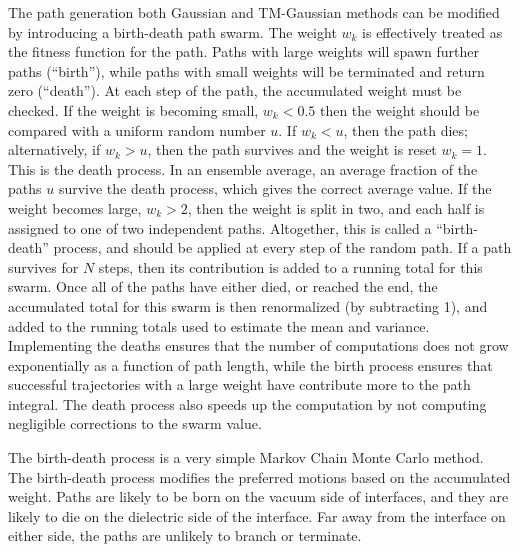 
The path generation both Gaussian and TM-Gaussian methods can be modified by introducing a birth-death path swarm.  
The weight $w_k$ is effectively treated as 
the fitness function for the path.  Paths with large weights will spawn further paths (``birth''), while paths with
small weights will be terminated and return zero (``death'').  At each step of the path, the 
accumulated weight must be checked.
If the weight is becoming small, $w_k<0.5$ then the weight should be compared with a uniform random number $u$.
If $w_k<u$, then the path dies; alternatively, if $w_k>u$, then 
the path survives and the weight is reset $w_k=1$.  This is the death process.
In an ensemble average, an average fraction of the paths $u$ survive the death process, which gives 
the correct average value.
If the weight becomes large, $w_k>2$, then the weight is split in two, and each half is assigned to 
one of two independent paths.
Altogether, this is called a ``birth-death'' process, and should be applied at every step of the random path.
If a path survives for $N$ steps, then its contribution is added to a running total for this swarm.
Once all of the paths have either died, or reached the end, the accumulated total for this swarm is then
renormalized (by subtracting 1), and added to the running totals used to estimate the mean and variance.  
Implementing the deaths ensures that the number of computations  does not grow exponentially as a function 
of path length, while the birth process ensures that successful trajectories with a large weight have 
contribute more to the path integral.  The death process also speeds up the computation by not computing 
negligible corrections to the swarm value.  

The birth-death process is a very simple Markov Chain Monte Carlo method.  The birth-death
process modifies the preferred motions based on the accumulated weight.  Paths are likely to be born
on the vacuum side of interfaces, and they are likely to die on the dielectric side of the interface.
Far away from the interface on either side, the paths are unlikely to branch or terminate.  

